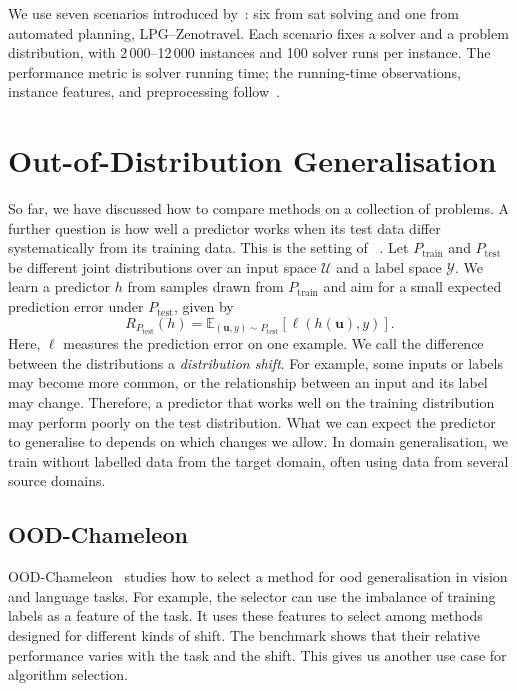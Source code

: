We use seven scenarios introduced by~\citet{EggEtAl18}: six from \gls{sat} solving and one from automated planning, LPG--Zenotravel. Each scenario fixes a solver and a problem distribution, with 2\,000--12\,000 instances and 100 solver runs per instance. The performance metric is solver running time; the running-time observations, instance features, and preprocessing follow~\citet{EggEtAl18}.

\section{Out-of-Distribution Generalisation}
\label{sec:ch03:ood}

So far, we have discussed how to compare methods on a collection of problems. A further question is how well a predictor works when its test data differ systematically from its training data. This is the setting of ~\citep{WilEtAl22}. Let $P_{\mathrm{train}}$ and $P_{\mathrm{test}}$ be different joint distributions over an input space $\mathcal U$ and a label space $\mathcal Y$. We learn a predictor $h$ from samples drawn from $P_{\mathrm{train}}$ and aim for a small expected prediction error under $P_{\mathrm{test}}$, given by
\begin{equation*}
    R_{P_{\mathrm{test}}}(h) =
    \mathbb E_{(\mathbf u,y)\sim P_{\mathrm{test}}}
    [\ell(h(\mathbf u),y)].
\end{equation*}
Here, $\ell$ measures the prediction error on one example. We call the difference between the distributions a \emph{distribution shift}. For example, some inputs or labels may become more common, or the relationship between an input and its label may change. Therefore, a predictor that works well on the training distribution may perform poorly on the test distribution. What we can expect the predictor to generalise to depends on which changes we allow. In domain generalisation, we train without labelled data from the target domain, often using data from several source domains.

\subsection{OOD-Chameleon}

OOD-Chameleon~\citep{JiaTen25} studies how to select a method for \gls{ood} generalisation in vision and language tasks. For example, the selector can use the imbalance of training labels as a feature of the task. It uses these features to select among methods designed for different kinds of shift. The benchmark shows that their relative performance varies with the task and the shift. This gives us another use case for algorithm selection.
